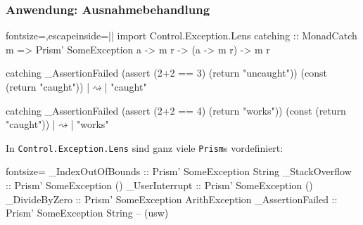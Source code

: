 \documentclass{beamer}
\newcommand{\ev}{$\rightsquigarrow$} %
\begin{document}
\begin{frame}[fragile,t]
  \frametitle{Anwendung: Ausnahmebehandlung}
  \begin{haskellcode*}{fontsize=\small,escapeinside=||}
import Control.Exception.Lens
catching :: MonadCatch m => Prism' SomeException a
         -> m r -> (a -> m r) -> m r

catching _AssertionFailed (assert (2+2 == 3) (return "uncaught"))
                          (const (return "caught"))
|\ev| "caught"

catching _AssertionFailed (assert (2+2 == 4) (return "works"))
                          (const (return "caught"))
|\ev| "works"
  \end{haskellcode*}

  In \verb|Control.Exception.Lens| sind ganz viele \verb|Prism|s vordefiniert:
  \begin{minipage}{0.85 \linewidth}
    \begin{mdframed}[backgroundcolor=blue!10]
      \begin{haskellcode*}{fontsize=\footnotesize}
_IndexOutOfBounds :: Prism' SomeException String
_StackOverflow    :: Prism' SomeException ()
_UserInterrupt    :: Prism' SomeException ()
_DivideByZero     :: Prism' SomeException ArithException
_AssertionFailed  :: Prism' SomeException String
-- (usw)
      \end{haskellcode*}
    \end{mdframed}
  \end{minipage}
\end{frame}



\end{document}
